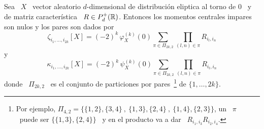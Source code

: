 \begin{teorema}
  Sea \  $X$ \  vector aleatorio $d$-dimensional  de distribuci\'on  eliptica al
  torno de $0$  \ y de matriz caracter\'istica \  $R \in P_d^+(\mathbb{R})$. Entonces
  los momentos centrales impares son nulos y los pares son dados por
  \[
  \zeta_{i_1,\ldots,i_{2  k}}[X] =  (-2)^k \,  \varphi_X^{(k)}(0)  \sum_{\pi \in
    \Pi_{2 k , 2}} \prod_{(l,n) \in \pi} R_{i_l,i_n}
  \]
  y
  \[
  \kappa_{i_1,\ldots,i_{2  k}}[X]  =  (-2)^k  \, \psi_X^{(k)}(0)  \sum_{\pi  \in
    \Pi_{2 k , 2}} \prod_{(l,n) \in \pi} R_{i_l,i_n}
  \]
  donde   \  $\Pi_{2   k  ,   2}$   \  es   el  conjunto   de  particiones   por
  pares~\footnote{Por ejemplo,  $\Pi_{4,2} =  \big\{ \{1,2\} ,  \{3,4\} \:  , \:
    \{1,3\} , \{2,4\} \: , \: \{1,4\}  , \{2,3\} \big\}$, un \ $\pi$ \ puede ser
    $\big\{ \{1,3\} , \{2,4\} \big\}$ \ y en el producto va a dar \ $R_{i_1,i_3}
    R_{i_2,i_4}$.} de $\{ 1 , \ldots , 2 k \}$.
\end{teorema}
%
